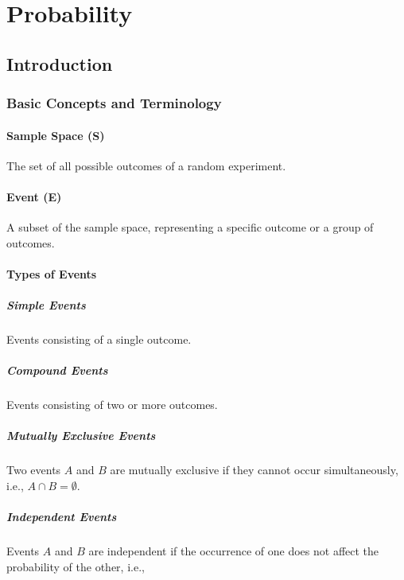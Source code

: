 \chapter{Probability}\label{Probability}


\section{Introduction}\label{Introduction}

\subsection{Basic Concepts and Terminology}

\subsubsection{Sample Space (S)}
The set of all possible outcomes of a random experiment.

\subsubsection{Event (E)}
A subset of the sample space, representing a specific outcome or a group of outcomes.

\subsubsection{Types of Events}
\paragraph{Simple Events}
Events consisting of a single outcome.

\paragraph{Compound Events}
Events consisting of two or more outcomes.

\paragraph{Mutually Exclusive Events}
Two events \( A \) and \( B \) are mutually exclusive if they cannot occur simultaneously, i.e., \( A \cap B = \emptyset \).

\paragraph{Independent Events}
Events \( A \) and \( B \) are independent if the occurrence of one does not affect the probability of the other, i.e.,

